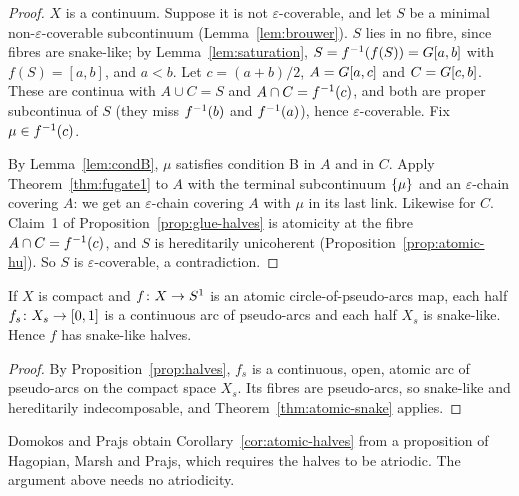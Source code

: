 \begin{proof}
$X$ is a continuum. Suppose it is not $\varepsilon$-coverable, and let $S$ be a minimal non-$\varepsilon$-coverable subcontinuum (Lemma~\ref{lem:brouwer}).
$S$ lies in no fibre, since fibres are snake-like; by Lemma~\ref{lem:saturation}, $S=f^{-1}(f(S))=G[a,b]$ with $f(S)=[a,b]$, and $a<b$. Let $c=(a+b)/2$,
$A=G[a,c]$ and $C=G[c,b]$. These are continua with $A\cup C=S$ and $A\cap C=f^{-1}(c)$, and both are proper subcontinua of $S$ (they miss $f^{-1}(b)$ and $f^{-1}(a)$), hence $\varepsilon$-coverable. Fix $\mu\in f^{-1}(c)$.

By Lemma~\ref{lem:condB}, $\mu$ satisfies condition B in $A$ and in $C$. Apply Theorem~\ref{thm:fugate1} to $A$ with the terminal subcontinuum $\left\{ \mu \right\}$ and an $\varepsilon$-chain
covering $A$: we get an $\varepsilon$-chain covering $A$ with $\mu$ in its last link. Likewise for $C$. Claim~1 of Proposition~\ref{prop:glue-halves} is
atomicity at the fibre $A\cap C=f^{-1}(c)$, and $S$ is hereditarily unicoherent (Proposition~\ref{prop:atomic-hu}). So $S$ is $\varepsilon$-coverable, a
contradiction.
\end{proof}


\begin{corollary}\label{cor:atomic-halves}
If $X$ is compact and $f\colon X\to S^1$ is an atomic circle-of-pseudo-arcs map, each half $f_s\colon X_s\to[0,1]$ is a continuous arc of pseudo-arcs and each
half $X_s$ is snake-like. Hence $f$ has snake-like halves.
\end{corollary}

\begin{proof}
By Proposition~\ref{prop:halves}, $f_s$ is a continuous, open, atomic arc of pseudo-arcs on the compact space $X_s$. Its fibres are pseudo-arcs, so snake-like
and hereditarily indecomposable, and Theorem~\ref{thm:atomic-snake} applies.
\end{proof}


\begin{remark}
Domokos and Prajs obtain Corollary~\ref{cor:atomic-halves} from a proposition of Hagopian, Marsh and Prajs, which requires the halves to be atriodic. The
argument above needs no atriodicity.
\end{remark}

